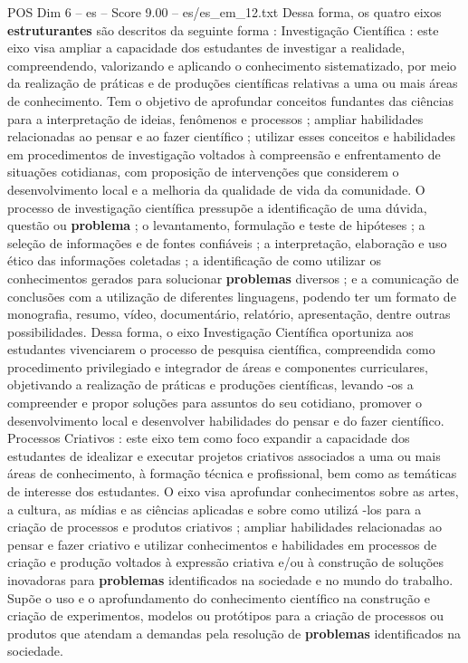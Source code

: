 \begin{textsample}{POS Dim 6 – es – Score 9.00 – es/es\_em\_12.txt}
Dessa forma, os quatro eixos \textbf{estruturantes} são descritos da seguinte forma : Investigação Científica : este eixo visa ampliar a capacidade dos estudantes de investigar a realidade, compreendendo, valorizando e aplicando o conhecimento sistematizado, por meio da realização de práticas e de produções científicas relativas a uma ou mais áreas de conhecimento.
Tem o objetivo de aprofundar conceitos fundantes das ciências para a interpretação de ideias, fenômenos e processos ; ampliar habilidades relacionadas ao pensar e ao fazer científico ; utilizar esses conceitos e habilidades em procedimentos de investigação voltados à compreensão e enfrentamento de situações cotidianas, com proposição de intervenções que considerem o desenvolvimento local e a melhoria da qualidade de vida da comunidade.
O processo de investigação científica pressupõe a identificação de uma dúvida, questão ou \textbf{problema} ; o levantamento, formulação e teste de hipóteses ; a seleção de informações e de fontes confiáveis ; a interpretação, elaboração e uso ético das informações coletadas ; a identificação de como utilizar os conhecimentos gerados para solucionar \textbf{problemas} diversos ; e a comunicação de conclusões com a utilização de diferentes linguagens, podendo ter um formato de monografia, resumo, vídeo, documentário, relatório, apresentação, dentre outras possibilidades.
Dessa forma, o eixo Investigação Científica oportuniza aos estudantes vivenciarem o processo de pesquisa científica, compreendida como procedimento privilegiado e integrador de áreas e componentes curriculares, objetivando a realização de práticas e produções científicas, levando -os a compreender e propor soluções para assuntos do seu cotidiano, promover o desenvolvimento local e desenvolver habilidades do pensar e do fazer científico.
Processos Criativos : este eixo tem como foco expandir a capacidade dos estudantes de idealizar e executar projetos criativos associados a uma ou mais áreas de conhecimento, à formação técnica e profissional, bem como as temáticas de interesse dos estudantes.
O eixo visa aprofundar conhecimentos sobre as artes, a cultura, as mídias e as ciências aplicadas e sobre como utilizá -los para a criação de processos e produtos criativos ; ampliar habilidades relacionadas ao pensar e fazer criativo e utilizar conhecimentos e habilidades em processos de criação e produção voltados à expressão criativa e/ou à construção de soluções inovadoras para \textbf{problemas} identificados na sociedade e no mundo do trabalho.
Supõe o uso e o aprofundamento do conhecimento científico na construção e criação de experimentos, modelos ou protótipos para a criação de processos ou produtos que atendam a demandas pela resolução de \textbf{problemas} identificados na sociedade.

\end{textsample}
